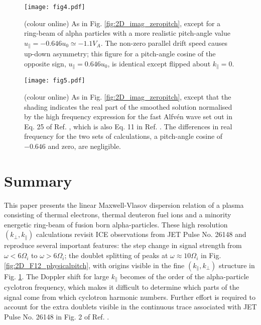 \documentclass[12pt]{iopart}
\begin{document}
\begin{figure}[ht!]
    \raggedleft
\texttt{[image: fig4.pdf]}
    \caption{(colour online) As in Fig. \ref{fig:2D_imag_zeropitch}, except for
    a ring-beam of alpha particles with a more realistic pitch-angle value
    $u_{\parallel} = -0.646 u_0 \simeq -1.1 V_A$. The non-zero parallel drift
    speed causes up-down asymmetry; this figure for a pitch-angle cosine of the
    opposite sign, $u_{\parallel} = 0.646 u_0$, is identical except flipped
    about $k_\parallel=0$.}
    \label{fig:2D_imag_physicalpitch}
\end{figure}


\begin{figure}[ht!]
    \raggedleft
\texttt{[image: fig5.pdf]}
    \caption{(colour online) As in Fig. \ref{fig:2D_imag_zeropitch}, except that
    the shading indicates the real part of the smoothed solution normalised by
    the high frequency expression for the fast Alfv{\'e}n wave set out in Eq. 25
    of Ref. \cite{Dendy1994}, which is also Eq. 11 in Ref.
    \cite{McClements1996}. The differences in real frequency for the two sets of
    calculations, a pitch-angle cosine of $-0.646$ and zero, are
    negligible.}
    \label{fig:2D_real_zeropitch}
\end{figure}

\section{Summary}

This paper presents the linear Maxwell-Vlasov dispersion relation of a plasma
consisting of thermal electrons, thermal deuteron fuel ions and a minority
energetic ring-beam of fusion born alpha-particles. These high resolution
$(k_\perp, k_\parallel)$ calculations revisit ICE observations from JET Pulse
No. 26148\cite{Cottrell1993,Dendy1995} and reproduce several important features:
the step change in signal strength from $\omega < 6\Omega_i$ to $\omega > 6\Omega_i$; the
doublet splitting of peaks at $\omega \approx 10\Omega_i$ in Fig.
\ref{fig:2D_F12_physicalpitch}, with origins visible in the fine $(k_\parallel,
k_\perp)$ structure in Fig. \ref{fig:2D_imag_physicalpitch}. The Doppler shift
for large $k_\parallel$ becomes of the order of the alpha-particle cyclotron
frequency, which makes it difficult to determine which parts of the signal come
from which cyclotron harmonic numbers. Further effort is required to account for
the extra doublets visible in the continuous trace associated with JET Pulse No.
26148 in Fig. 2 of Ref. \cite{Cottrell1993}.
\end{document}
